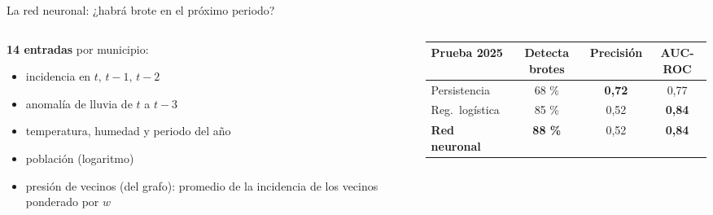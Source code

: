 \documentclass[aspectratio=169,10pt]{beamer}
\newcommand{\pC}{Andrés Mendible}
\newcommand{\orador}{}
\newcommand{\persona}[2]{\renewcommand{\orador}{Persona #1 · #2}}
\begin{document}
\persona{3}{\pC}
\begin{frame}{La red neuronal: ¿habrá brote en el próximo periodo?}
  \begin{columns}[T]
    \begin{column}{0.46\textwidth}
      \textbf{14 entradas} por municipio:
      \begin{itemize}\setlength\itemsep{1pt}\footnotesize
        \item incidencia en $t,\,t{-}1,\,t{-}2$
        \item anomalía de lluvia de $t$ a $t{-}3$
        \item temperatura, humedad y periodo del año
        \item población (logaritmo)
        \item \alert{presión de vecinos} (del grafo): promedio de la incidencia de los vecinos ponderado por $w$
      \end{itemize}
      \vspace{3pt}
      \centering
    \end{column}
    \begin{column}{0.54\textwidth}
      \footnotesize
      \centering
      \begin{tabular}{lccc}
        \toprule
        Prueba 2025 & Detecta brotes & Precisión & AUC-ROC\\
        \midrule
        Persistencia & 68 \% & \textbf{0,72} & 0,77\\
        Reg.\ logística & 85 \% & 0,52 & \textbf{0,84}\\
        \textbf{Red neuronal} & \textbf{88 \%} & 0,52 & \textbf{0,84}\\

\end{tabular}
\end{column}
\end{columns}
\end{frame}
\end{document}
